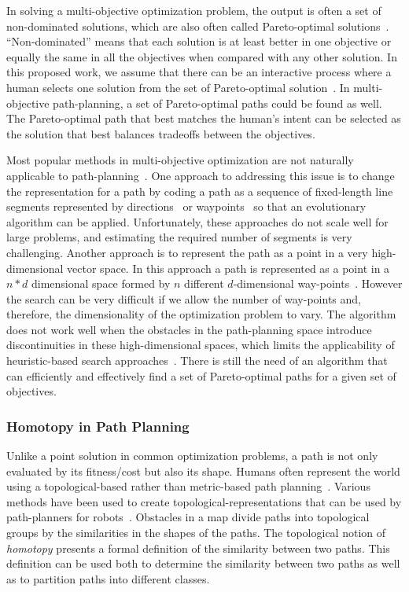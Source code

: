\documentclass[phd]{byuprop}
\begin{document}
In solving a multi-objective optimization problem, the output is often a set of non-dominated solutions, which are also often called Pareto-optimal solutions~\cite{Miettinen1999}.
``Non-dominated''  means that each solution is at least better in one objective or equally the same in all the objectives when compared with any other solution.
In this proposed work, we assume that there can be an interactive process where a human selects one solution from the set of Pareto-optimal solution~\cite{Marler2004}.
In multi-objective path-planning, a set of Pareto-optimal paths could be found as well.
The Pareto-optimal path that best matches the human's intent can be selected as the solution that best balances tradeoffs between the objectives.

Most popular methods in multi-objective optimization are not naturally applicable to path-planning~\cite{Zhang2007,Deb2014}.
One approach to addressing this issue is to change the representation for a path by coding a path as a sequence of fixed-length line segments represented by directions~\cite{Ahmed2013,Howlett2006} or waypoints~\cite{Sujit2009,Pires2004} so that an evolutionary algorithm can be applied. 
Unfortunately, these approaches do not scale well for large problems, and estimating the required number of segments is very challenging. 
Another approach is to represent the path as a point in a very high-dimensional vector space.
In this approach a path is represented as a point in a $ n * d $ dimensional space formed by $ n $ different  $d$-dimensional way-points~\cite{Ahmed2011,Ahmed2013}.
However the search can be very difficult if we allow the number of way-points and, therefore, the dimensionality of the optimization problem to vary. 
The algorithm does not work well when the obstacles in the path-planning space introduce discontinuities in these high-dimensional spaces, which limits the applicability of heuristic-based search approaches~\cite{Sujit2009,Zhang2007}.
There is still the need of an algorithm that can efficiently and effectively find a set of Pareto-optimal paths for a given set of objectives.

\subsubsection{Homotopy in Path Planning}
\label{sec:related_work:algorithm_specific_work:homotopy_in_path_planning}


Unlike a point solution in common optimization problems, a path is not only evaluated by its fitness/cost but also its shape.
Humans often represent the world using a topological-based rather than metric-based path planning~\cite{Aginsky1997,kuipers1999}. 
Various methods have been used to create topological-representations that can be used by path-planners for robots~\cite{Mataric1992,Thrun1998,Fasola2013,Shah2013}.
Obstacles in a map divide paths into topological groups by the similarities in the shapes of the paths. 
The topological notion of {\em homotopy} presents a formal definition of the similarity between two paths. 
This definition can be used both to determine the similarity between two paths as well as to partition paths into different classes.
\end{document}
